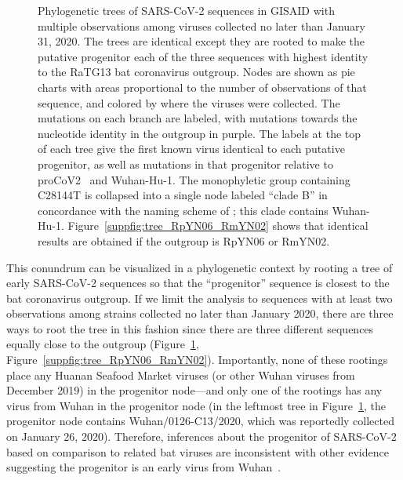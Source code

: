 \documentclass[9pt,twocolumn,twoside]{gsajnl_modified}
\begin{document}
\begin{figure}
{ }
 \caption{
 Phylogenetic trees of SARS-CoV-2 sequences in GISAID with multiple observations among viruses collected no later than January 31, 2020.
 The trees are identical except they are rooted to make the putative progenitor each of the three sequences with highest identity to the RaTG13 bat coronavirus outgroup.
Nodes are shown as pie charts with areas proportional to the number of observations of that sequence, and colored by where the viruses were collected.
The mutations on each branch are labeled, with mutations towards the nucleotide identity in the outgroup in purple.
The labels at the top of each tree give the first known virus identical to each putative progenitor, as well as mutations in that progenitor relative to proCoV2~\citep{kumar2021evolutionary} and Wuhan-Hu-1.
The monophyletic group containing C28144T is collapsed into a single node labeled ``clade B'' in concordance with the naming scheme of \citet{rambaut2020dynamic}; this clade contains Wuhan-Hu-1.
 Figure~\ref{suppfig:tree_RpYN06_RmYN02} shows that identical results are obtained if the outgroup is RpYN06 or RmYN02.
\label{fig:tree_RaTG13}
 }
 \end{figure}

This conundrum can be visualized in a phylogenetic context by rooting a tree of early SARS-CoV-2 sequences so that the ``progenitor'' sequence is closest to the bat coronavirus outgroup.
If we limit the analysis to sequences with at least two observations among strains collected no later than January 2020, there are three ways to root the tree in this fashion since there are three different sequences equally close to the outgroup (Figure~\ref{fig:tree_RaTG13}, Figure~\ref{suppfig:tree_RpYN06_RmYN02}).
Importantly, none of these rootings place any Huanan Seafood Market viruses (or other Wuhan viruses from December 2019) in the progenitor node---and only one of the rootings has any virus from Wuhan in the progenitor node (in the leftmost tree in Figure~\ref{fig:tree_RaTG13}, the progenitor node contains Wuhan/0126-C13/2020, which was reportedly collected on January 26, 2020).
Therefore, inferences about the progenitor of SARS-CoV-2 based on comparison to related bat viruses are inconsistent with other evidence suggesting the progenitor is an early virus from Wuhan~\citep{pipes2021assessing}.
\end{document}
